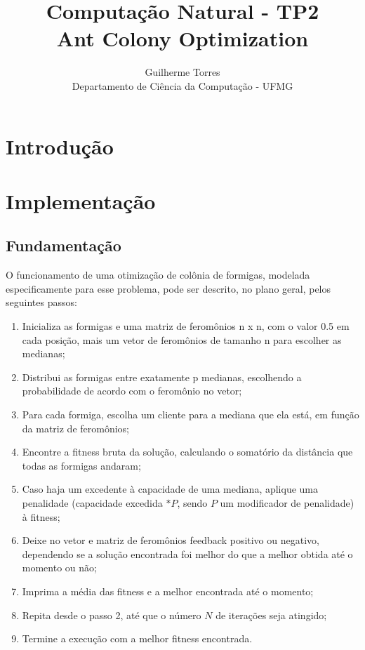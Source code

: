 \documentclass[11pt]{article}
\begin{document}
\title{Computação Natural - TP2\\Ant Colony Optimization}
\author{Guilherme Torres\\Departamento de Ciência da Computação - UFMG}
\date{}
\maketitle

\section{Introdução}

\section{Implementação}

\subsection{Fundamentação}

O funcionamento de uma otimização de colônia de formigas, modelada especificamente para esse problema, pode ser descrito, no plano geral, pelos seguintes passos:

\begin{enumerate}
	\item Inicializa as formigas e uma matriz de feromônios n x n, com o valor 0.5 em cada posição, mais um vetor de feromônios de tamanho n para escolher as medianas;
	\item Distribui as formigas entre exatamente p medianas, escolhendo a probabilidade de acordo com o feromônio no vetor;
	\item Para cada formiga, escolha um cliente para a mediana que ela está, em função da matriz de feromônios;
	\item Encontre a fitness bruta da solução, calculando o somatório da distância que todas as formigas andaram;
	\item Caso haja um excedente à capacidade de uma mediana, aplique uma penalidade (capacidade excedida $* P$, sendo $P$ um modificador de penalidade) à fitness;
	\item Deixe no vetor e matriz de feromônios feedback positivo ou negativo, dependendo se a solução encontrada foi melhor do que a melhor obtida até o momento ou não;
	\item Imprima a média das fitness e a melhor encontrada até o momento;
	\item Repita desde o passo 2, até que o número $N$ de iterações seja atingido;
	\item Termine a execução com a melhor fitness encontrada.
\end{enumerate}
\end{document}
